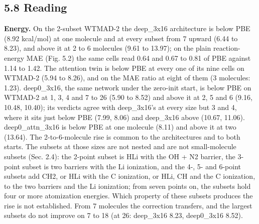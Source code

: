 \documentclass[10pt,a4paper]{article}
\begin{document}
\subsection*{5.8 Reading}

\textbf{Energy.} On the 2-subset WTMAD-2 the deep\_3x16 architecture is below PBE (8.92 kcal/mol) at one molecule and at every subset from 7 upward (6.44 to 8.23), and above it at 2 to 6 molecules (9.61 to 13.97); on the plain reaction-energy MAE (Fig. 5.2) the same cells read 0.64 and 0.67 to 0.81 of PBE against 1.14 to 1.42. The attention twin is below PBE at every one of its nine cells on WTMAD-2 (5.94 to 8.26), and on the MAE ratio at eight of them (3 molecules: 1.23). deep0\_3x16, the same network under the zero-init start, is below PBE on WTMAD-2 at 1, 3, 4 and 7 to 26 (5.90 to 8.52) and above it at 2, 5 and 6 (9.16, 10.48, 10.40); its verdicts agree with deep\_3x16's at every size but 3 and 4, where it sits just below PBE (7.99, 8.06) and deep\_3x16 above (10.67, 11.06). deep0\_attn\_3x16 is below PBE at one molecule (8.11) and above it at two (13.64). The 2-to-6-molecule rise is common to the architectures and to both starts. The subsets at those sizes are not nested and are not small-molecule subsets (Sec. 2.4): the 2-point subset is HLi with the OH + N2 barrier, the 3-point subset is two barriers with the Li ionization, and the 4-, 5- and 6-point subsets add CH2, or HLi with the C ionization, or HLi, CH and the C ionization, to the two barriers and the Li ionization; from seven points on, the subsets hold four or more atomization energies. Which property of these subsets produces the rise is not established. From 7 molecules the correction transfers, and the largest subsets do not improve on 7 to 18 (at 26: deep\_3x16 8.23, deep0\_3x16 8.52).
\end{document}
